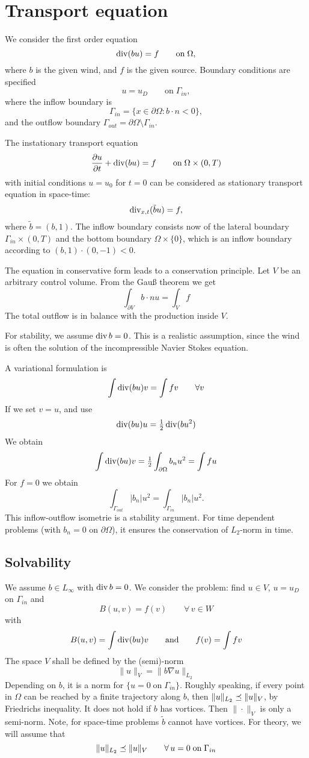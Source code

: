 \section{Transport equation}
We consider the first order equation
$$
\operatorname{div} (bu) = f  \qquad \text{on}  \; \Omega,
$$
where $b$ is the given wind, and $f$ is the given source.
Boundary conditions are specified
$$
u = u_D \qquad \text{on} \; \Gamma_{in},
$$
where the inflow boundary is 
$$
\Gamma_{in} = \{ x \in \partial \Omega : b \cdot n < 0 \},
$$
and the outflow boundary $\Gamma_{out} = \partial \Omega \setminus
\Gamma_{in}$.

The instationary transport equation
$$
\frac{\partial u}{\partial t}  + \operatorname{div} (bu) = f  \qquad \text{on}  \;
\Omega \times (0,T)
$$
with initial conditions $u = u_0$ for $t = 0$ can be considered as
stationary transport equation in space-time:
$$
\operatorname{div}_{x,t} (\tilde b u) = f,
$$
where $\tilde b = (b, 1)$. The inflow boundary consists now of the
lateral boundary $\Gamma_{in} \times (0,T)$ and the bottom
 boundary  $\Omega \times \{0 \}$, which is an inflow boundary according
 to $(b, 1) \cdot (0,-1) < 0$.


The equation in conservative form leads to a conservation
principle. Let $V$ be an arbitrary control volume. From the Gau\ss{}
theorem we get
$$
\int_{\partial V} b\cdot n u = \int_V f
$$
The total outflow is in balance with the production inside $V$.


For stability, we assume $\operatorname{div} b = 0$.  This is a realistic
assumption, since the wind is often the solution of the
incompressible Navier Stokes equation.

A variational formulation is
$$
\int \operatorname{div} (bu) v = \int f v \qquad \forall v 
$$
If we set $v = u$, and use
$$
\operatorname{div} (bu) u =  \tfrac{1}{2} \operatorname{div} (b u^2)
$$
We obtain
$$
\int \operatorname{div} (b u) v = \tfrac{1}{2} \int_{\partial \Omega} b_n u^2 =
\int f u
$$
For $f = 0$ we obtain 
$$
\int_{\Gamma_{out}} |b_n| u^2 = \int_{\Gamma_{in}} | b_n | u^2.
$$
This inflow-outflow isometrie is a stability argument. For time dependent problems
(with $b_n = 0$ on $\partial \Omega$), it ensures the conservation of
$L_2$-norm in time.

\subsection{Solvability}

We assume $b \in L_\infty$ with $\operatorname{div} b = 0$. We consider the problem: find $u \in V$,
$u = u_D$ on $\Gamma_{in}$ and 
$$
B(u,v) = f(v) \qquad \forall \, v \in W
$$
with 
$$
B(u,v) = \int \operatorname{div} (bu) v \qquad \text{and} \qquad f(v) = \int f v 
$$
The space $V$ shall be defined by the (semi)-norm
$$
\| u \|_V = \| b \nabla u \|_{L_2}
$$
Depending on $b$, it is a norm for $\{ u = 0 \; \text{on} \; \Gamma_{in}
\}$. Roughly speaking, if every point in $\Omega$ can be reached by a
finite trajectory along $b$, then $\| u \|_{L_2} \preceq \| u \|_V$, by
Friedrichs inequality. It does not hold if $b$ has vortices. Then
$\| \cdot \|_V$ is only a semi-norm. Note, for space-time problems
$\tilde b$ cannot have vortices. For theory, we will assume that
$$
\| u \|_{L_2} \preceq \| u \|_V \qquad \forall \, u = 0 \; \text{on} \; \Gamma_{in}
$$

